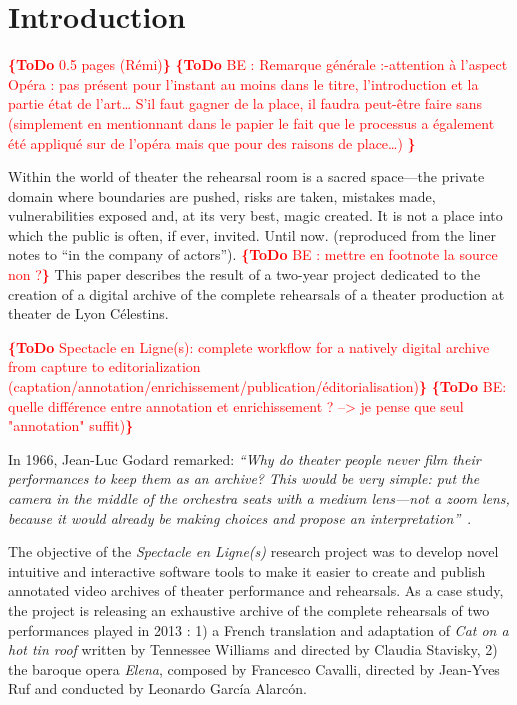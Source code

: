 \documentclass[conference]{IEEEtran}
\newcommand{\todo}[1]{\noindent\textcolor{red}{{\bf \{ToDo} #1{\bf \}}}}
\begin{document}
%
\IEEEpeerreviewmaketitle



\section{Introduction}

\todo{0.5 pages (Rémi)}
\todo{BE : Remarque générale :-attention à l’aspect Opéra : pas présent pour l’instant au moins dans le titre, l’introduction et la partie état de l’art… S’il faut gagner de la place, il faudra peut-être faire sans (simplement en mentionnant dans le papier le fait que le processus a également été appliqué sur de l’opéra mais que pour des raisons de place…) }

Within the world of theater the rehearsal room is a sacred space---the private domain where boundaries are pushed, risks are taken, mistakes made, vulnerabilities exposed and, at its very best, magic created. It is not a place into which the public is often, if ever, invited. Until now. (reproduced from the liner notes to ``in the company of actors'').
\todo{BE : mettre en footnote la source non ?}
 This paper describes the result of a two-year project dedicated to the creation of a digital archive  of  the complete  rehearsals of a theater production at theater de Lyon Célestins.

\todo{Spectacle en Ligne(s): complete workflow for a natively digital archive from capture to editorialization
(captation/annotation/enrichissement/publication/éditorialisation)}
\todo{BE: quelle différence entre annotation et enrichissement ? --> je pense que seul "annotation" suffit)}

In 1966, Jean-Luc Godard remarked: {\em ``Why do theater people never film their performances to keep  them as an archive? This would be very simple: put the camera in the middle of the orchestra seats with a medium lens---not a zoom lens, because it would already be making choices and propose an interpretation''}~\cite{Godard66}.

The objective of the \emph{Spectacle en Ligne(s)} research project was to develop novel intuitive and interactive software tools to make it easier to 
create and publish annotated video archives of theater performance and rehearsals. As a case study, the project is releasing an exhaustive archive of the complete rehearsals of two performances played in 2013 : 1) a French translation and adaptation of \emph{Cat on a hot tin roof} written by Tennessee Williams and directed by Claudia Stavisky, 2) the baroque opera \emph{Elena}, composed by Francesco Cavalli, directed by Jean-Yves Ruf and conducted by Leonardo García Alarcón.
\end{document}
